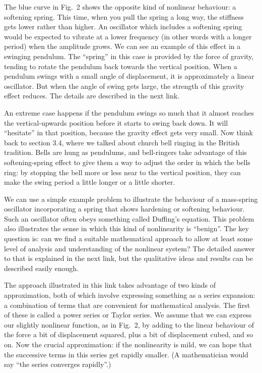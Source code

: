   The blue curve in Fig.\ 2 shows the opposite kind of nonlinear behaviour: a 
  softening spring. This time, when you pull the spring a long way, the 
  stiffness gets lower rather than higher. An oscillator which includes a 
  softening spring would be expected to vibrate at a lower frequency (in other 
  words with a longer period) when the amplitude grows. We can see an example 
  of this effect in a swinging pendulum. The ``spring'' in this case is 
  provided by the force of gravity, tending to rotate the pendulum back towards 
  the vertical position. When a pendulum swings with a small angle of 
  displacement, it is approximately a linear oscillator. But when the angle of 
  swing gets large, the strength of this gravity effect reduces. The details 
  are described in the next link. 

  An extreme case happens if the pendulum swings so much that it almost reaches 
  the vertical-upwards position before it starts to swing back down. It will 
  ``hesitate'' in that position, because the gravity effect gets very small. 
  Now think back to section 3.4, where we talked about church bell ringing in 
  the British tradition. Bells are hung as pendulums, and bell-ringers take 
  advantage of this softening-spring effect to give them a way to adjust the 
  order in which the bells ring: by stopping the bell more or less near to the 
  vertical position, they can make the swing period a little longer or a little 
  shorter. 

  We can use a simple example problem to illustrate the behaviour of a 
  mass-spring oscillator incorporating a spring that shows hardening or 
  softening behaviour. Such an oscillator often obeys something called 
  Duffing's equation. This problem also illustrates the sense in which this 
  kind of nonlinearity is “benign”. The key question is: can we find a suitable 
  mathematical approach to allow at least some level of analysis and 
  understanding of the nonlinear system? The detailed answer to that is 
  explained in the next link, but the qualitative ideas and results can be 
  described easily enough. 

  The approach illustrated in this link takes advantage of two kinds of 
  approximation, both of which involve expressing something as a series 
  expansion: a combination of terms that are convenient for mathematical 
  analysis. The first of these is called a power series or Taylor series. We 
  assume that we can express our slightly nonlinear function, as in Fig.\ 2, by 
  adding to the linear behaviour of the force a bit of displacement squared, 
  plus a bit of displacement cubed, and so on. Now the crucial approximation: 
  if the nonlinearity is mild, we can hope that the successive terms in this 
  series get rapidly smaller. (A mathematician would say “the series converges 
  rapidly”.) 

